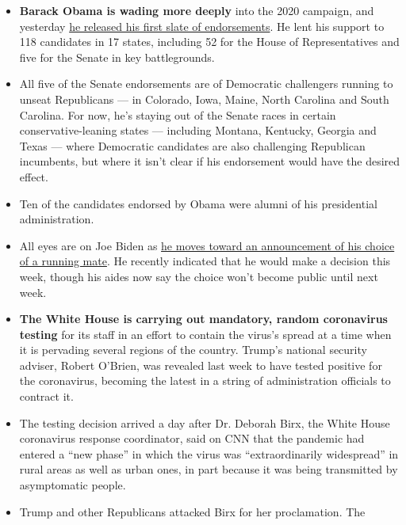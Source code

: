 \begin{itemize}
\item
  \textbf{Barack Obama is wading more deeply} into the 2020 campaign,
  and yesterday
  \href{https://www.nytimes3xbfgragh.onion/2020/08/03/us/elections/biden-vs-trump.html?action=click\&module=Top\%20Stories\&pgtype=Homepage\#link-3de249e6}{he
  released his first slate of endorsements}. He lent his support to 118
  candidates in 17 states, including 52 for the House of Representatives
  and five for the Senate in key battlegrounds.
\item
  All five of the Senate endorsements are of Democratic challengers
  running to unseat Republicans --- in Colorado, Iowa, Maine, North
  Carolina and South Carolina. For now, he's staying out of the Senate
  races in certain conservative-leaning states --- including Montana,
  Kentucky, Georgia and Texas --- where Democratic candidates are also
  challenging Republican incumbents, but where it isn't clear if his
  endorsement would have the desired effect.
\item
  Ten of the candidates endorsed by Obama were alumni of his
  presidential administration.
\item
  All eyes are on Joe Biden as
  \href{https://www.nytimes3xbfgragh.onion/article/biden-vice-president-2020.html?action=click\&pgtype=Article\&state=default\&module=styln-elections-2020\&region=TOP_BANNER\&context=storylines_menu}{he
  moves toward an announcement of his choice of a running mate}. He
  recently indicated that he would make a decision this week, though his
  aides now say the choice won't become public until next week.
\item
  \textbf{The White House is carrying out mandatory, random coronavirus
  testing} for its staff in an effort to contain the virus's spread at a
  time when it is pervading several regions of the country. Trump's
  national security adviser, Robert O'Brien, was revealed last week to
  have tested positive for the coronavirus, becoming the latest in a
  string of administration officials to contract it.
\item
  The testing decision arrived a day after Dr. Deborah Birx, the White
  House coronavirus response coordinator, said on CNN that the pandemic
  had entered a ``new phase'' in which the virus was ``extraordinarily
  widespread'' in rural areas as well as urban ones, in part because it
  was being transmitted by asymptomatic people.
\item
  Trump and other Republicans attacked Birx for her proclamation. The

\end{itemize}
